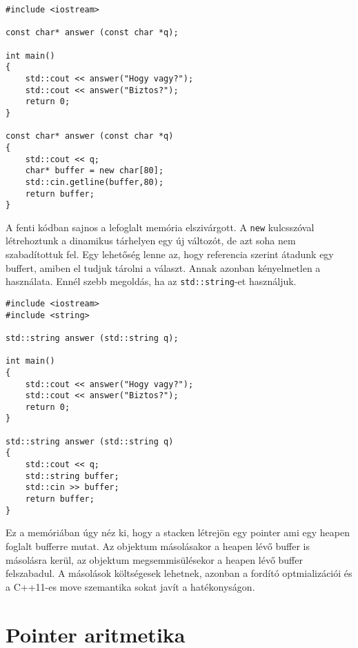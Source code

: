 \documentclass[a4paper,11.5pt,table]{article}
\begin{document}
	\begin{lstlisting}
#include <iostream>

const char* answer (const char *q);

int main()
{
	std::cout << answer("Hogy vagy?");
	std::cout << answer("Biztos?");
	return 0;
}

const char* answer (const char *q)
{
	std::cout << q;
	char* buffer = new char[80];
	std::cin.getline(buffer,80);
	return buffer;
}
	\end{lstlisting}
	A fenti kódban sajnos a lefoglalt memória elszivárgott. A \texttt{new} kulcsszóval létrehoztunk a dinamikus tárhelyen egy új változót, de azt soha nem szabadítottuk fel. Egy lehetőség lenne az, hogy referencia szerint átadunk egy buffert, amiben el tudjuk tárolni a választ. Annak azonban kényelmetlen a használata. Ennél szebb megoldás, ha az \texttt{std::string}-et használjuk.
	\begin{lstlisting}
#include <iostream>
#include <string>

std::string answer (std::string q);

int main()
{
	std::cout << answer("Hogy vagy?");
	std::cout << answer("Biztos?");
	return 0;
}

std::string answer (std::string q)
{
	std::cout << q;
	std::string buffer;
	std::cin >> buffer;
	return buffer;
}
	\end{lstlisting}
	
	Ez a memóriában úgy néz ki, hogy a stacken létrejön egy pointer ami egy heapen foglalt bufferre mutat. Az objektum másolásakor a heapen lévő buffer is másolásra kerül, az objektum megsemmisülésekor a heapen lévő buffer felszabadul. A másolások költségesek lehetnek, azonban a fordító optmializációi és a C++11-es move szemantika sokat javít a hatékonyságon.
	
	\section{Pointer aritmetika}
\end{document}
